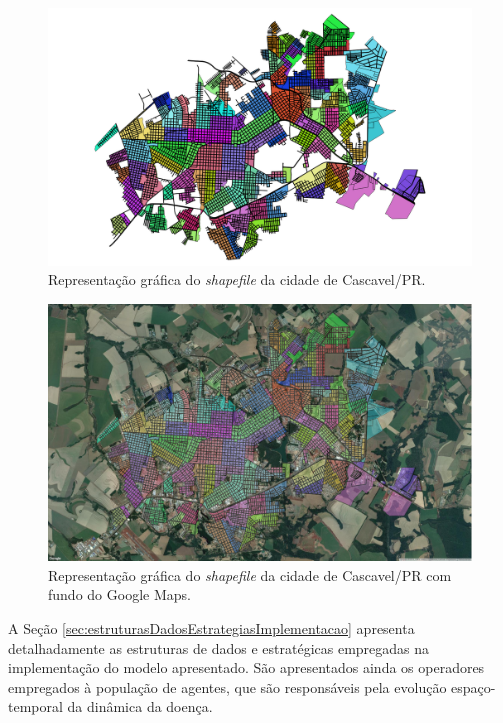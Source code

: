 \begin{figure}[H]
  \centering
  \includegraphics[width=1\textwidth]{Figuras/ModelagemAmbiente/Cascavel1.png}
  \caption{Representação gráfica do \textit{shapefile} da cidade de Cascavel/PR.}
  \label{fig:cascavel1}
\end{figure} 

\begin{figure}[H]
  \centering
  \includegraphics[width=1\textwidth]{Figuras/ModelagemAmbiente/Cascavel2.png}
  \caption{Representação gráfica do \textit{shapefile} da cidade de Cascavel/PR com fundo do Google Maps.}
  \label{fig:cascavel2}
\end{figure} 

A Seção \ref{sec:estruturasDadosEstrategiasImplementacao} apresenta detalhadamente as estruturas de dados e estratégicas empregadas na implementação do modelo apresentado. São apresentados ainda os operadores empregados à população de agentes, que são responsáveis pela evolução espaço-temporal da dinâmica da doença.

\newpage